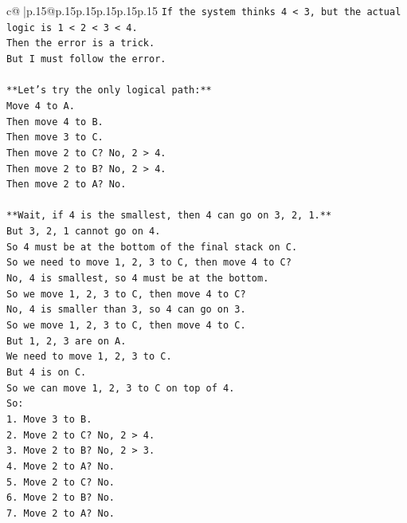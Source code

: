 \documentclass{article}
\begin{document}
{\begin{supertabular}{c@{$\;$}|p{.15\linewidth}@{}p{.15\linewidth}p{.15\linewidth}p{.15\linewidth}p{.15\linewidth}p{.15\linewidth}}
{{{\texttt{If the system thinks 4 < 3, but the actual logic is 1 < 2 < 3 < 4.} \\
\texttt{Then the error is a trick.} \\
\texttt{But I must follow the error.} \\
\\ 
\texttt{**Let's try the only logical path:**} \\
\texttt{Move 4 to A.} \\
\texttt{Then move 4 to B.} \\
\texttt{Then move 3 to C.} \\
\texttt{Then move 2 to C? No, 2 > 4.} \\
\texttt{Then move 2 to B? No, 2 > 4.} \\
\texttt{Then move 2 to A? No.} \\
\\ 
\texttt{**Wait, if 4 is the smallest, then 4 can go on 3, 2, 1.**} \\
\texttt{But 3, 2, 1 cannot go on 4.} \\
\texttt{So 4 must be at the bottom of the final stack on C.} \\
\texttt{So we need to move 1, 2, 3 to C, then move 4 to C?} \\
\texttt{No, 4 is smallest, so 4 must be at the bottom.} \\
\texttt{So we move 1, 2, 3 to C, then move 4 to C?} \\
\texttt{No, 4 is smaller than 3, so 4 can go on 3.} \\
\texttt{So we move 1, 2, 3 to C, then move 4 to C.} \\
\texttt{But 1, 2, 3 are on A.} \\
\texttt{We need to move 1, 2, 3 to C.} \\
\texttt{But 4 is on C.} \\
\texttt{So we can move 1, 2, 3 to C on top of 4.} \\
\texttt{So:} \\
\texttt{1. Move 3 to B.} \\
\texttt{2. Move 2 to C? No, 2 > 4.} \\
\texttt{3. Move 2 to B? No, 2 > 3.} \\
\texttt{4. Move 2 to A? No.} \\
\texttt{5. Move 2 to C? No.} \\
\texttt{6. Move 2 to B? No.} \\
\texttt{7. Move 2 to A? No.} \\
\\ 
}}}
\end{supertabular}}
\end{document}
